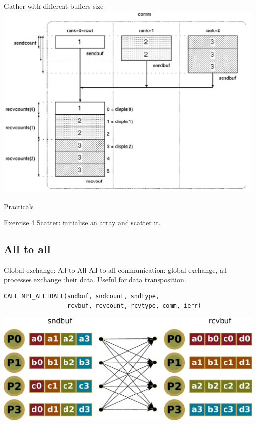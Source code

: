 \documentclass[aspectratio=43]{beamer}
\begin{document}
\begin{frame}{Gather with different buffers size}
\includegraphics[scale=0.5]{03.MPI_Coll/gather2.pdf}
\end{frame}

\begin{frame}{Practicals}
    \begin{brown2block}{Exercise 4}
        Scatter: initialise an array and scatter it.
    \end{brown2block}
\end{frame}


\subsection{All to all}
\begin{frame}[fragile]{Global exchange: All to All}
All-to-all communication: global exchange, all processes exchange their data. Useful for data transposition.\\
\vspace{-0.2cm}
\footnotesize
\begin{verbatim}
CALL MPI_ALLTOALL(sndbuf, sndcount, sndtype,
                  rcvbuf, rcvcount, rcvtype, comm, ierr)
\end{verbatim}
\normalsize
\begin{center}
\includegraphics[scale=0.5]{03.MPI_Coll/alltoall.pdf}
\end{center}
\end{frame}
\end{document}
